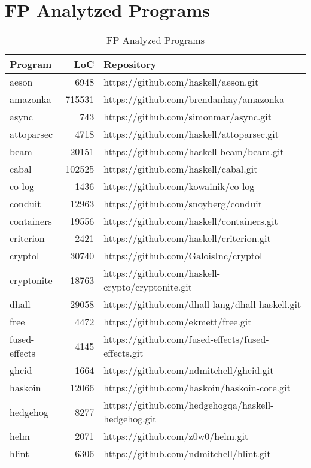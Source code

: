 \documentclass[12pt, a4paper]{article}
\begin{document}
\section{FP Analytzed Programs}
\begin{longtable}[H]{l r l}
    \caption{FP Analyzed Programs}\label{table:fp_prog_1}\\
        Program & LoC & Repository \\
        \hline            
        \endhead
        aeson & 6948 & https://github.com/haskell/aeson.git \\
        amazonka & 715531 & https://github.com/brendanhay/amazonka \\
        async & 743 & https://github.com/simonmar/async.git \\
        attoparsec & 4718 & https://github.com/haskell/attoparsec.git \\
        beam & 20151 & https://github.com/haskell-beam/beam.git \\
        cabal & 102525 & https://github.com/haskell/cabal.git \\
        co-log & 1436 & https://github.com/kowainik/co-log \\
        conduit & 12963 & https://github.com/snoyberg/conduit \\
        containers & 19556 & https://github.com/haskell/containers.git \\
        criterion & 2421 & https://github.com/haskell/criterion.git \\
        cryptol & 30740 & https://github.com/GaloisInc/cryptol \\
        cryptonite & 18763 & https://github.com/haskell-crypto/cryptonite.git \\
        dhall & 29058 & https://github.com/dhall-lang/dhall-haskell.git \\
        free & 4472 & https://github.com/ekmett/free.git \\
        fused-effects & 4145 & https://github.com/fused-effects/fused-effects.git \\
        ghcid & 1664 & https://github.com/ndmitchell/ghcid.git \\
        haskoin & 12066 & https://github.com/haskoin/haskoin-core.git \\
        hedgehog & 8277 & https://github.com/hedgehogqa/haskell-hedgehog.git \\
        helm & 2071 & https://github.com/z0w0/helm.git \\
        hlint & 6306 & https://github.com/ndmitchell/hlint.git \\

\end{longtable}
\end{document}
